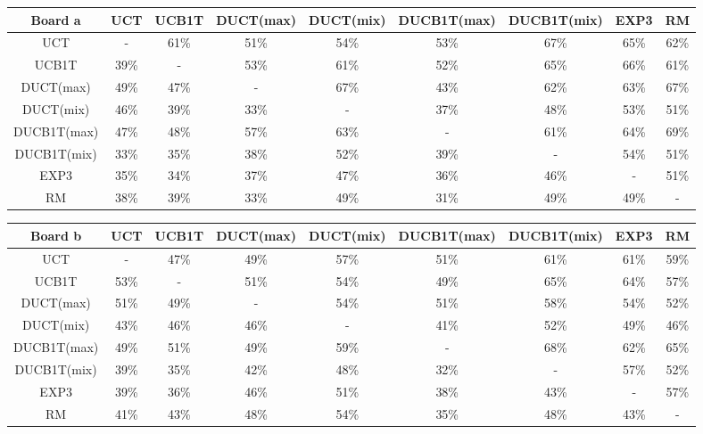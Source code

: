 \documentclass{article}
\begin{document}
\begin{table}[t]\scriptsize
\centering
\begin{tabular}{|c||c|c|c|c|c|c|c|c|}
									\hline
  Board a 		& UCT 	& UCB1T		& DUCT(max)	& DUCT(mix)	& DUCB1T(max)	& DUCB1T(mix)	& EXP3	& RM				\\ 	\hline\hline
  UCT 			&  -	& 61\%		& 51\% 		& 54\%		& 53\%		& 67\%		& 65\%	& 62\%				\\ 	\hline
  UCB1T 		& 39\% 	& - 		& 53\%		& 61\%		& 52\%		& 65\%		& 66\%	& 61\%				\\ 	\hline
  DUCT(max) 		& 49\% 	& 47\%		& -		& 67\%		& 43\%		& 62\%		& 63\%	& 67\%				\\ 	\hline
  DUCT(mix) 		& 46\% 	& 39\% 		& 33\%		& -		& 37\%		& 48\%		& 53\%	& 51\%				\\ 	\hline
  DUCB1T(max)	 	& 47\% 	& 48\% 		& 57\%		& 63\%		& -		& 61\%		& 64\%	& 69\%				\\ 	\hline
  DUCB1T(mix)	 	& 33\% 	& 35\% 		& 38\%		& 52\%		& 39\%		& -		& 54\%	& 51\%				\\ 	\hline
  EXP3 			& 35\% 	& 34\% 		& 37\%		& 47\%		& 36\%		& 46\%		& -	& 51\%				\\ 	\hline
  RM		 	& 38\%	& 39\% 		& 33\%		& 49\%		& 31\%		& 49\%		& 49\%	& -				\\ 	\hline
\end{tabular}
\begin{tabular}{|c||c|c|c|c|c|c|c|c|}
									\hline
  Board b 		& UCT 	& UCB1T		& DUCT(max)	& DUCT(mix)	& DUCB1T(max)	& DUCB1T(mix)	& EXP3	& RM				\\ 	\hline\hline
  UCT 			&  -	& 47\%		& 49\%		& 57\%		& 51\%		& 61\%		& 61\%	& 59\%				\\ 	\hline
  UCB1T 		& 53\% 	& - 		& 51\%		& 54\%		& 49\%		& 65\%		& 64\%	& 57\%				\\ 	\hline
  DUCT(max) 		& 51\% 	& 49\% 		& -		& 54\%		& 51\%		& 58\%		& 54\%	& 52\%				\\ 	\hline
  DUCT(mix) 		& 43\%	& 46\% 		& 46\%		& -		& 41\%		& 52\%		& 49\%	& 46\%				\\ 	\hline
  DUCB1T(max)	 	& 49\% 	& 51\% 		& 49\%		& 59\%		& -		& 68\%		& 62\%	& 65\%				\\ 	\hline
  DUCB1T(mix)	 	& 39\% 	& 35\% 		& 42\%		& 48\%		& 32\%		& -		& 57\%	& 52\%				\\ 	\hline
  EXP3 			& 39\% 	& 36\% 		& 46\%		& 51\%		& 38\%		& 43\%		& -	& 57\%				\\ 	\hline
  RM 			& 41\% 	& 43\% 		& 48\%		& 54\%		& 35\%		& 48\%		& 43\%	& -				\\ 	\hline

\end{tabular}
\end{table}
\end{document}

